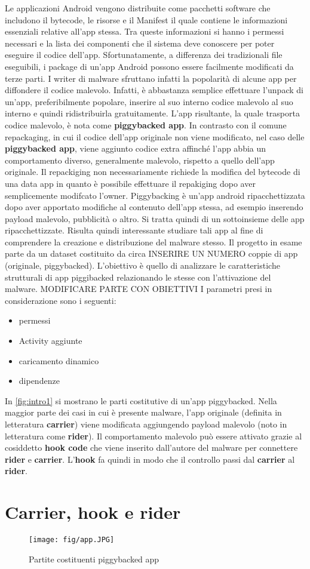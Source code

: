 Le applicazioni Android vengono distribuite come pacchetti software che includono il bytecode, le risorse e il Manifest il quale contiene le informazioni essenziali relative all'app stessa. Tra queste informazioni si hanno i permessi necessari e la lista dei componenti che il sistema deve conoscere per poter eseguire il codice dell'app. Sfortunatamente, a differenza dei tradizionali file eseguibili, i package di un'app Android possono essere facilmente modificati da terze parti. I writer di malware sfruttano infatti la popolarità di alcune app per diffondere il codice malevolo. Infatti, è abbastanza semplice effettuare l'unpack di un'app, preferibilmente popolare, inserire al suo interno codice malevolo al suo interno e quindi ridistribuirla gratuitamente. L'app risultante, la quale trasporta codice malevolo, è nota come \textbf{piggybacked app}. In contrasto con il comune repackaging, in cui il codice dell'app originale non viene modificato, nel caso delle \textbf{piggybacked app}, viene aggiunto codice extra affinché l'app abbia un comportamento diverso, generalmente malevolo, rispetto a quello dell'app originale. 
Il repackiging non necessariamente richiede la modifica del bytecode di una data app in quanto è possibile effettuare il repakiging dopo aver semplicemente modifcato l'owner. Piggybacking è un'app android ripacchettizzata dopo aver apportato modifiche al contenuto dell'app stessa, ad esempio inserendo payload malevolo, pubblicità o altro. Si tratta quindi di un sottoinsieme delle app ripacchettizzate.
Risulta quindi interessante studiare tali app al fine di comprendere la creazione e distribuzione del malware stesso.
Il progetto in esame parte da un dataset costituito da circa INSERIRE UN NUMERO coppie di app (originale, piggybacked). L'obiettivo è quello di analizzare le caratteristiche strutturali di app piggibacked relazionando le stesse con l'attivazione del malware. 
MODIFICARE PARTE CON OBIETTIVI 
I parametri presi in considerazione sono i seguenti:
\begin{itemize}
	\item permessi
	\item Activity aggiunte
	\item caricamento dinamico
	\item dipendenze 
\end{itemize}
In \autoref{fig:intro1} si mostrano le parti costitutive di un'app piggybacked. Nella maggior parte dei casi in cui è presente malware, l'app originale (definita in letteratura \textbf{carrier}) viene modificata aggiungendo payload malevolo (noto in letteratura come \textbf{rider}). Il comportamento malevolo può essere attivato grazie al cosiddetto \textbf{hook code} che viene inserito dall'autore del malware per connettere \textbf{rider} e \textbf{carrier}. L'\textbf{hook} fa quindi in modo che il controllo passi dal \textbf{carrier} al \textbf{rider}.
\section{Carrier, hook e rider}
\begin{figure}[h]
	\centering
	\texttt{[image: fig/app.JPG]}
	\caption{Partite costituenti piggybacked app}
	\label{fig:intro1}
\end{figure}
